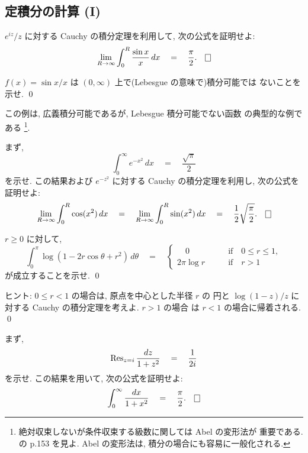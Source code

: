 \documentclass[12pt,twoside]{jarticle}
\begin{document}
\subsection{定積分の計算 (I)}

\begin{question}
  $e^{iz}/z$ に対する Cauchy の積分定理を利用して, 次の公式を証明せよ:
  \[
    \lim_{R\to\infty} \int_0^R \frac{\sin x}{x}\,dx 
    \quad = \quad
    \frac{\pi}{2}.
    \qed
  \]
\end{question}

\begin{question}
  $f(x)= \sin x/x$ は $(0,\infty)$ 上で(Lebesgue の意味で)積分可能では
  ないことを示せ.  \qed
\end{question}

\noindent この例は, 広義積分可能であるが, Lebesgue 積分可能でない函数
の典型的な例である%
\footnote{絶対収束しないが条件収束する級数に関しては Abel の変形法が
  重要である. \cite{kaiseki-gairon} の p.153 を見よ. Abel の変形法は, 
  積分の場合にも容易に一般化される.}. 

\begin{question}
  まず, 
  \[
    \int_0^\infty e^{-x^2}\,dx
    \quad = \quad
    \frac{\sqrt{\pi}}{2}
  \]
  を示せ. この結果および $e^{-z^2}$ に対する Cauchy の積分定理を利用し,
  次の公式を証明せよ:
  \[
    \lim_{R\to\infty}\int_0^R \cos(x^2)\,dx
    \quad = \quad
    \lim_{R\to\infty}\int_0^R \sin(x^2)\,dx
    \quad = \quad
    \frac{1}{2}\sqrt{\frac{\pi}{2}}.
    \qed
  \]
\end{question}

\begin{question}
  $r \ge 0$ に対して,
  \[
    \int_0^\pi \log(1 - 2r\cos\theta + r^2)\,d\theta
    \quad = \quad
    \begin{cases}
      \quad 0    \qquad & \text{if}\quad 0 \le r \le 1, \\
      2\pi\log r \qquad & \text{if}\quad r > 1
    \end{cases}
  \]
  が成立することを示せ. \qed
\end{question}

\noindent ヒント: $0 \le r < 1$ の場合は, 原点を中心とした半径 $r$ の
円と $\log(1 - z)/z$ に対する Cauchy の積分定理を考えよ. $r>1$ の場合
は $r<1$ の場合に帰着される. \qed

\begin{question}
  まず,
  \[
    \mathop{\mathrm{Res}}\nolimits_{z=i}\frac{dz}{1+z^2} 
    \quad = \quad
    \frac{1}{2i}
  \]
  を示せ. この結果を用いて, 次の公式を証明せよ:
  \[
    \int_0^\infty \frac{dx}{1+x^2} 
    \quad = \quad
    \frac{\pi}{2}.
    \qed
  \]
\end{question}
\end{document}
